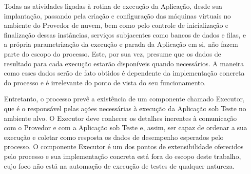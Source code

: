 Todas as atividades ligadas à rotina de execução da Aplicação, desde sua implantação,
passando pela criação e configuração das máquinas virtuais no ambiente do Provedor 
de nuvem, bem como pelo controle de inicialização e finalização dessas instâncias, 
serviços subjacentes como bancos de dados e filas, e a própria parametrização da 
execução e parada da Aplicação em si, não fazem parte do escopo do processo. Este,
por sua vez, presume que os dados de resultado para cada execução estarão disponíveis
quando necessários. A maneira como esses dados serão de fato obtidos é dependente
da implementação concreta do processo e é irrelevante do ponto de vista do seu 
funcionamento.  

Entretanto, o processo prevê a existência de um componente chamado Executor, que é 
o responsável pelas ações necessárias à execução da Aplicação sob Teste no ambiente
alvo. O Executor deve conhecer os detalhes inerentes à comunicação com o Provedor 
e com a Aplicação sob Teste e, assim, ser capaz de ordenar a sua execução e coletar
como resposta os dados de desempenho esperados pelo processo. O componente Executor
é um dos pontos de extensibilidade oferecidos pelo processo e sua implementação
concreta está fora do escopo deste trabalho, cujo foco não está na automação de
execução de testes de qualquer natureza.

